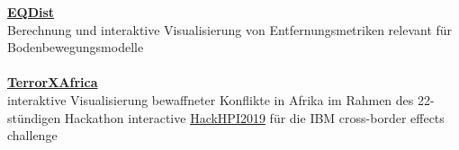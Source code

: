 \documentclass{article}
\newcommand{\spacingWork}{0.25cm}
\begin{document}
\begin{minipage}[t]{0.69\textwidth}
			\textbf{\large\color{pblue}\href{https://earthquake-distances.herokuapp.com}{EQDist}}\\
		{Berechnung und interaktive Visualisierung von Entfernungsmetriken relevant für Bodenbewegungsmodelle}\\\\
%		
%		
%		
%		
			\textbf{\large\color{pblue}\href{https://terrorxafrica.herokuapp.com}{TerrorXAfrica}}\\
		{interaktive Visualisierung bewaffneter Konflikte in Afrika im Rahmen des 22-stündigen Hackathon interactive \href{https://hackhpi2019.devpost.com}{\color{pblue}HackHPI2019} für die IBM cross-border effects challenge}
\end{minipage}
\end{document}
